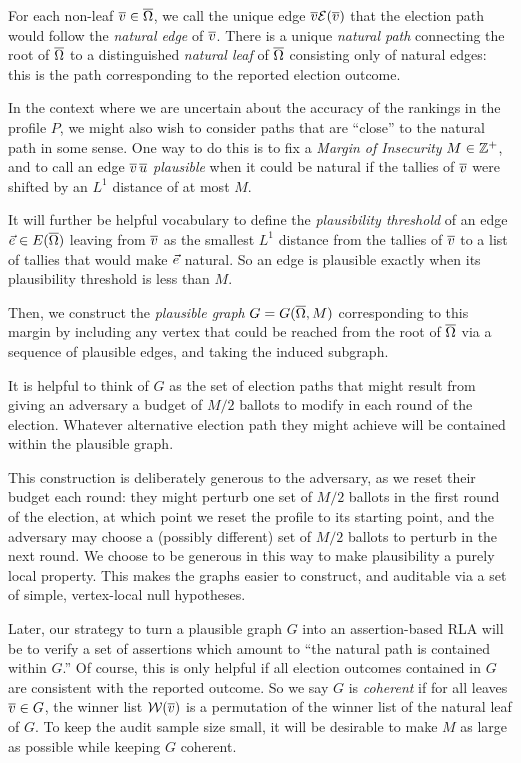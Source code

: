 For each non-leaf $\overline{v}\in \overline{\Omega}$, we call the unique edge $\overline{v}\mathcal{E}(\overline{v})$ that the election path would follow the \emph{natural edge} of $\overline{v}$.
There is a unique \emph{natural path} connecting the root of $\overline{\Omega}$ to a distinguished \emph{natural leaf} of $\overline{\Omega}$ consisting only of natural edges: this is the path corresponding to the reported election outcome.

In the context where we are uncertain about the accuracy of the rankings in the profile $P$, we might also wish to consider paths that are ``close'' to the natural path in some sense.
One way to do this is to fix a \emph{Margin of Insecurity} $M\in \mathbb{Z}^+$, and to call an edge $\overline{v}\,\overline{u}$ \emph{plausible} when it could be natural if the tallies of $\overline{v}$ were shifted by an $L^1$ distance of at most $M$.

It will further be helpful vocabulary to define the \emph{plausibility threshold} of an edge $\ve\in E(\oO)$ leaving from $\overline{v}$ as the smallest $L^1$ distance from the tallies of $\overline{v}$ to a list of tallies that would make $\ve$ natural.
So an edge is plausible exactly when its plausibility threshold is less than $M$.

Then, we construct the \emph{plausible graph} $G=G(\overline{\Omega}, M)$ corresponding to this margin by including any vertex that could be reached from the root of $\overline{\Omega}$ via a sequence of plausible edges, and taking the induced subgraph.

It is helpful to think of $G$ as the set of election paths that might result from giving an adversary a budget of $M/2$ ballots to modify in each round of the election.
Whatever alternative election path they might achieve will be contained within the plausible graph.

This construction is deliberately generous to the adversary, as we reset their budget each round: they might perturb one set of $M/2$ ballots in the first round of the election, at which point we reset the profile to its starting point, and the adversary may choose a (possibly different) set of $M/2$ ballots to perturb in the next round.
We choose to be generous in this way to make plausibility a purely local property. This makes the graphs easier to construct, and auditable via a set of simple, vertex-local null hypotheses.

Later, our strategy to turn a plausible graph $G$ into an assertion-based RLA will be to verify a set of assertions which amount to ``the natural path is contained within $G$.''
Of course, this is only helpful if all election outcomes contained in $G$ are consistent with the reported outcome. 
So we say $G$ is \emph{coherent} if for all leaves $\overline{v}\in G$, the winner list $\mathcal{W}(\overline{v})$ is a permutation of the winner list of the natural leaf of $G$.
To keep the audit sample size small, it will be desirable to make $M$ as large as possible while keeping $G$ coherent.

